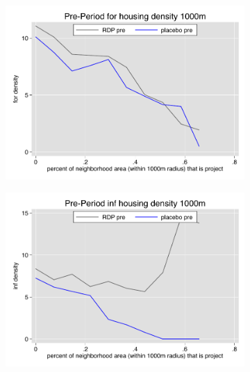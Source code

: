 \documentclass[12pt]{article}
\begin{document}
\pagebreak





\begin{figure}
        \begin{subfigure}[b]{0.495\textwidth}
            \centering
            \includegraphics[width=\textwidth,trim={0.3cm .3cm 0.1cm 0cm}, clip=true]{figures/overlap_for_1000_local_pre.pdf}
        \end{subfigure}
        \hfill
        \begin{subfigure}[b]{0.495\textwidth}  
            \centering 
            \includegraphics[width=\textwidth,trim={0.3cm .3cm 0.1cm 0cm}, clip=true]{figures/overlap_inf_1000_local_pre.pdf}

\end{subfigure}
\end{figure}
\end{document}
